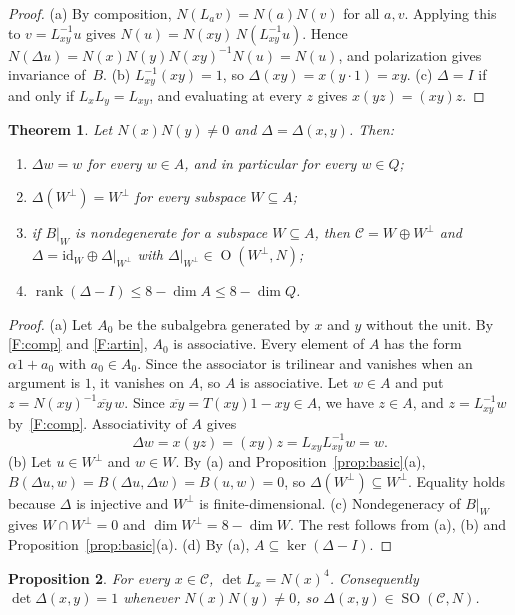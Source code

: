 \documentclass[11pt]{amsart}
\newtheorem{theorem}{Theorem}[section]
\newtheorem{proposition}[theorem]{Proposition}
\theoremstyle{definition}
\theoremstyle{remark}
\newcommand{\C}{\mathcal{C}}
\newcommand{\conj}[1]{\overline{#1}}
\DeclareMathOperator{\rank}{rank}
\DeclareMathOperator{\Ort}{O}
\DeclareMathOperator{\SO}{SO}
\begin{document}
\begin{proof}
(a) By composition, $N(L_av)=N(a)N(v)$ for all $a,v$. Applying this to
$v=L_{xy}^{-1}u$ gives $N(u)=N(xy)\,N(L_{xy}^{-1}u)$. Hence
$N(\Delta u)=N(x)N(y)N(xy)^{-1}N(u)=N(u)$, and polarization gives
invariance of~$B$.
(b) $L_{xy}^{-1}(xy)=1$, so $\Delta(xy)=x(y\cdot1)=xy$.
(c) $\Delta=I$ if and only if $L_xL_y=L_{xy}$, and evaluating at every $z$ gives
$x(yz)=(xy)z$.
\end{proof}

\begin{theorem}\label{thm:fixed}
Let $N(x)N(y)\neq0$ and $\Delta=\Delta(x,y)$. Then:
\begin{enumerate}[label=\textup{(\alph*)}]
\item $\Delta w=w$ for every $w\in A$, and in particular for every $w\in Q$;
\item $\Delta(W^\perp)=W^\perp$ for every subspace $W\subseteq A$;
\item if $B|_W$ is nondegenerate for a subspace $W\subseteq A$, then
  $\C=W\oplus W^\perp$ and $\Delta=\mathrm{id}_W\oplus\Delta|_{W^\perp}$ with
  $\Delta|_{W^\perp}\in\Ort(W^\perp,N)$;
\item $\rank(\Delta-I)\le 8-\dim A\le 8-\dim Q$.
\end{enumerate}
\end{theorem}

\begin{proof}
(a) Let $A_0$ be the subalgebra generated by $x$ and $y$ without the unit. By
\ref{F:comp} and \ref{F:artin}, $A_0$ is associative. Every element of $A$ has
the form $\alpha1+a_0$ with $a_0\in A_0$. Since the associator is trilinear and
vanishes when an argument is $1$, it vanishes on $A$, so $A$ is associative.
Let $w\in A$ and put $z=N(xy)^{-1}\conj{xy}\,w$. Since
$\conj{xy}=T(xy)1-xy\in A$, we have $z\in A$, and
$z=L_{xy}^{-1}w$ by~\ref{F:comp}. Associativity of $A$ gives
\[
  \Delta w=x(yz)=(xy)z=L_{xy}L_{xy}^{-1}w=w.
\]
(b) Let $u\in W^\perp$ and $w\in W$. By (a) and
Proposition~\ref{prop:basic}(a),
$B(\Delta u,w)=B(\Delta u,\Delta w)=B(u,w)=0$, so
$\Delta(W^\perp)\subseteq W^\perp$. Equality holds because $\Delta$ is injective
and $W^\perp$ is finite-dimensional.
(c) Nondegeneracy of $B|_W$ gives $W\cap W^\perp=0$ and
$\dim W^\perp=8-\dim W$. The rest follows from (a), (b) and
Proposition~\ref{prop:basic}(a).
(d) By (a), $A\subseteq\ker(\Delta-I)$.
\end{proof}

\begin{proposition}\label{prop:det}
For every $x\in\C$, $\det L_x=N(x)^4$. Consequently $\det\Delta(x,y)=1$
whenever $N(x)N(y)\neq0$, so $\Delta(x,y)\in\SO(\C,N)$.
\end{proposition}
\end{document}
